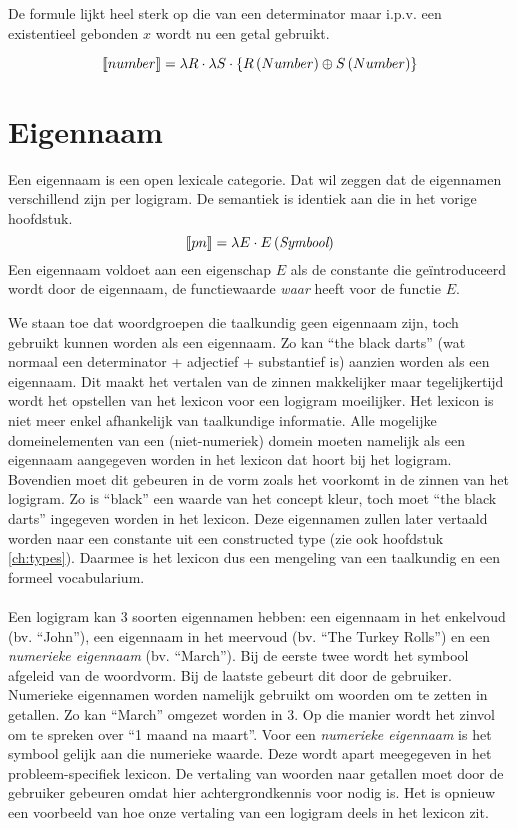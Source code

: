 De formule lijkt heel sterk op die van een determinator maar i.p.v. een existentieel gebonden $x$ wordt nu een getal gebruikt.

$$\llbracket number\rrbracket = \lambda R \cdot \lambda S \cdot \left\{ R \left( Number \right) \oplus S \left( Number \right) \right\}$$

\section{Eigennaam}
\label{sec:lex-pn}
Een eigennaam is een open lexicale categorie. Dat wil zeggen dat de eigennamen verschillend zijn per logigram. De semantiek is identiek aan die in het vorige hoofdstuk. $$\llbracket pn\rrbracket = \lambda E \cdot E \left( \textit{Symbool} \right)$$ Een eigennaam voldoet aan een eigenschap $E$ als de constante die geïntroduceerd wordt door de eigennaam, de functiewaarde \textit{waar} heeft voor de functie $E$.

We staan toe dat woordgroepen die taalkundig geen eigennaam zijn, toch gebruikt kunnen worden als een eigennaam. Zo kan ``the black darts'' (wat normaal een determinator + adjectief + substantief is) aanzien worden als een eigennaam. Dit maakt het vertalen van de zinnen makkelijker maar tegelijkertijd wordt het opstellen van het lexicon voor een logigram moeilijker. Het lexicon is niet meer enkel afhankelijk van taalkundige informatie. Alle mogelijke domeinelementen van een (niet-numeriek) domein moeten namelijk als een eigennaam aangegeven worden in het lexicon dat hoort bij het logigram. Bovendien moet dit gebeuren in de vorm zoals het voorkomt in de zinnen van het logigram. Zo is ``black'' een waarde van het concept kleur, toch moet ``the black darts'' ingegeven worden in het lexicon. Deze eigennamen zullen later vertaald worden naar een constante uit een constructed type (zie ook hoofdstuk \ref{ch:types}). Daarmee is het lexicon dus een mengeling van een taalkundig en een formeel vocabularium.

\paragraph{}Een logigram kan 3 soorten eigennamen hebben: een eigennaam in het enkelvoud (bv. ``John''), een eigennaam in het meervoud (bv. ``The Turkey Rolls'') en een \textit{numerieke eigennaam} (bv. ``March''). Bij de eerste twee wordt het symbool afgeleid van de woordvorm. Bij de laatste gebeurt dit door de gebruiker. Numerieke eigennamen worden namelijk gebruikt om woorden om te zetten in getallen. Zo kan ``March'' omgezet worden in 3. Op die manier wordt het zinvol om te spreken over ``1 maand na maart''. Voor een \textit{numerieke eigennaam} is het symbool gelijk aan die numerieke waarde. Deze wordt apart meegegeven in het probleem-specifiek lexicon. De vertaling van woorden naar getallen moet door de gebruiker gebeuren omdat hier achtergrondkennis voor nodig is. Het is opnieuw een voorbeeld van hoe onze vertaling van een logigram deels in het lexicon zit.

